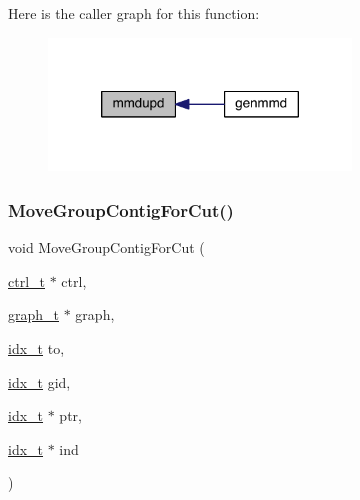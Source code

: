 Here is the caller graph for this function\+:\nopagebreak
\begin{figure}[H]
\begin{center}
\leavevmode
\includegraphics[width=228pt]{a00945_a718418159740294aa04f16c7897231a4_icgraph}
\end{center}
\end{figure}
\mbox{\label{a00945_a59be93c110982dd4b4e918957804e3b7}} 
\subsubsection{\texorpdfstring{Move\+Group\+Contig\+For\+Cut()}{MoveGroupContigForCut()}}
{\footnotesize\ttfamily void Move\+Group\+Contig\+For\+Cut (\begin{DoxyParamCaption}\item[{\hyperlink{a00742}{ctrl\+\_\+t} $\ast$}]{ctrl,  }\item[{\hyperlink{a00734}{graph\+\_\+t} $\ast$}]{graph,  }\item[{\hyperlink{a00876_aaa5262be3e700770163401acb0150f52}{idx\+\_\+t}}]{to,  }\item[{\hyperlink{a00876_aaa5262be3e700770163401acb0150f52}{idx\+\_\+t}}]{gid,  }\item[{\hyperlink{a00876_aaa5262be3e700770163401acb0150f52}{idx\+\_\+t} $\ast$}]{ptr,  }\item[{\hyperlink{a00876_aaa5262be3e700770163401acb0150f52}{idx\+\_\+t} $\ast$}]{ind }\end{DoxyParamCaption})}


